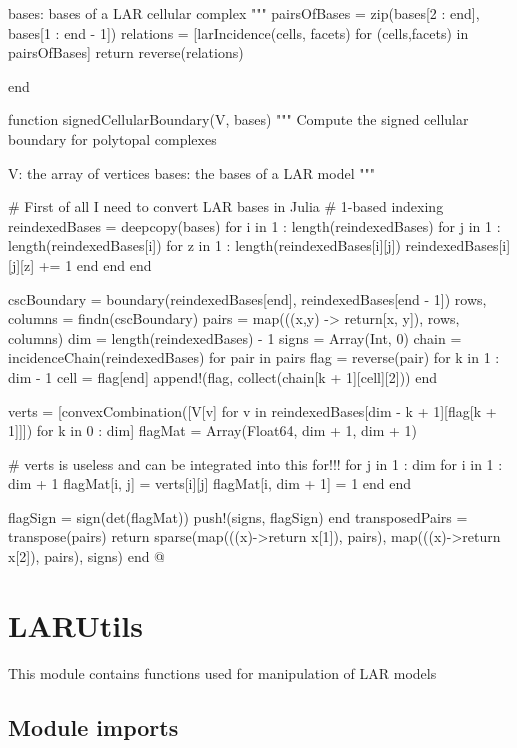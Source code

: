 \documentclass[11pt,oneside]{article}	%
\begin{document}
{  bases: bases of a LAR cellular complex
  """
  pairsOfBases = zip(bases[2 : end], bases[1 : end - 1])
  relations = [larIncidence(cells, facets) for (cells,facets) in pairsOfBases]
  return reverse(relations)

end

function signedCellularBoundary(V, bases)
  """
  Compute the signed cellular boundary
  for polytopal complexes

  V: the array of vertices
  bases: the bases of a LAR model
  """
  
  # First of all I need to convert LAR bases in Julia
  # 1-based indexing
  reindexedBases = deepcopy(bases)
  for i in 1 : length(reindexedBases)
    for j in 1 : length(reindexedBases[i])
      for z in 1 : length(reindexedBases[i][j])
        reindexedBases[i][j][z] += 1
      end
    end
  end

  cscBoundary = boundary(reindexedBases[end], reindexedBases[end - 1])
  rows, columns = findn(cscBoundary)
  pairs = map(((x,y) -> return[x, y]), rows, columns)
  dim = length(reindexedBases) - 1
  signs = Array(Int, 0)
  chain = incidenceChain(reindexedBases)
  for pair in pairs
    flag = reverse(pair)
    for k in 1 : dim - 1
      cell = flag[end]
      append!(flag, collect(chain[k + 1][cell][2]))
    end
        
    verts = [convexCombination([V[v] for v in reindexedBases[dim - k + 1][flag[k + 1]]]) for k in 0 : dim]
    flagMat = Array(Float64, dim + 1, dim + 1)
    
    # verts is useless and can be integrated into this for!!!
    for j in 1 : dim
      for i in 1 : dim + 1
        flagMat[i, j] = verts[i][j]
        flagMat[i, dim + 1] = 1
      end
    end
    
    flagSign = sign(det(flagMat))
    push!(signs, flagSign)
  end
  transposedPairs = transpose(pairs)
  return sparse(map(((x)->return x[1]), pairs), map(((x)->return x[2]), pairs), signs)
end @}

\section{LARUtils}\label{sec:LARUtils}

This module contains functions used for manipulation of LAR models

\subsection{Module imports}\label{sec:LARUtilsImports}
\end{document}
